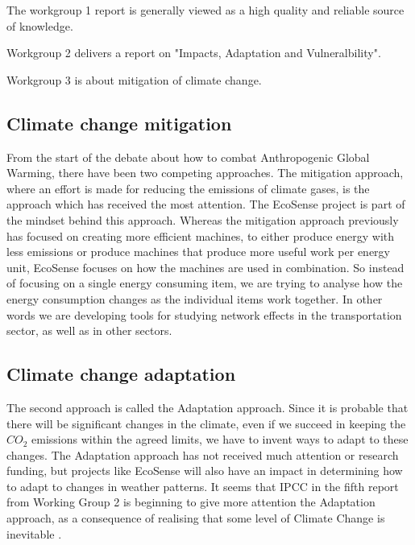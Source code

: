 The workgroup 1 report is generally viewed as a high quality and reliable source of knowledge.

Workgroup 2 delivers a report on "Impacts, Adaptation and Vulneralbility". 

Workgroup 3 is about mitigation of climate change.



\subsection{Climate change mitigation}From the start of the debate about how to combat Anthropogenic Global Warming, there have been two competing approaches. The mitigation approach, where an effort is made for reducing the emissions of climate gases, is the approach which has received the most attention\cite{Pielke2007}. The EcoSense project is part of the mindset behind this approach. Whereas the mitigation approach previously has focused on creating more efficient machines, to either produce energy with less emissions or produce machines that produce more useful work per energy unit\cite{Chakraborty2013}, EcoSense focuses on how the machines are used in combination. So instead of focusing on a single energy consuming item, we are trying to analyse how the energy consumption changes as the individual items work together. In other words we are developing tools for studying network effects in the transportation sector, as well as in other sectors.


\subsection{Climate change adaptation}
The second approach is called the Adaptation approach. Since it is probable that there will be significant changes in the climate, even if we succeed in keeping the $CO_2$ emissions within the agreed limits, we have to invent ways to adapt to these changes. The Adaptation approach has not received much attention or research funding, but projects like EcoSense will also have an impact in determining how to adapt to changes in weather patterns. It seems that IPCC in the fifth report from Working Group 2 is beginning to give more attention the Adaptation approach, as a consequence of realising that some level of Climate Change is inevitable \cite{kelly2000}\cite{smithers1997}.

